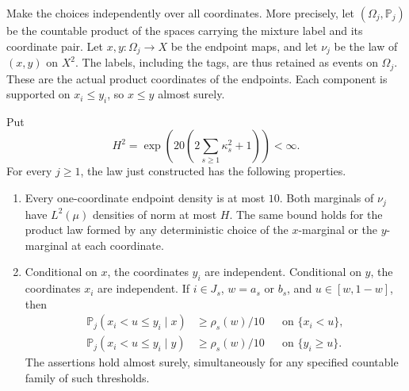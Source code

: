 Make the choices independently over all coordinates.  More precisely,
let $(\Omega_j,\mathbb P_j)$ be the countable product of the spaces
carrying the mixture label and its coordinate pair.  Let
$x,y:\Omega_j\to X$ be the endpoint maps, and let $\nu_j$ be the law of
$(x,y)$ on $X^2$.  The labels, including the tags, are thus retained as
events on $\Omega_j$.  These are the actual product coordinates of the
endpoints.  Each component is supported on $x_i\le y_i$, so $x\le y$
almost surely.

\begin{lemma}
\label{p:lem:coupling-marginals}
Put
\begin{equation}\label{p:eq:uniform-product-density}
 H^2=\exp\left(20\left(2\sum_{s\ge1}\kappa_s^2+1\right)\right)<\infty.
\end{equation}
For every $j\ge1$, the law just constructed has the following properties.
\begin{enumerate}
 \item Every one-coordinate endpoint density is at most $10$.  Both
 marginals of $\nu_j$ have $L^2(\mu)$ densities of norm at most $H$.
 The same bound holds for the product law formed by any deterministic
 choice of the $x$-marginal or the $y$-marginal at each coordinate.
 \item Conditional on $x$, the coordinates $y_i$ are independent.
 Conditional on $y$, the coordinates $x_i$ are independent.  If
 $i\in J_s$, $w=a_s$ or $b_s$, and $u\in[w,1-w]$, then
 \begin{align}
  \mathbb P_j(x_i<u\le y_i\mid x)&\ge\rho_s(w)/10
       &&\text{on }\{x_i<u\},\label{p:eq:crossing-given-x}\\
  \mathbb P_j(x_i<u\le y_i\mid y)&\ge\rho_s(w)/10
       &&\text{on }\{y_i\ge u\}.
       \label{p:eq:crossing-given-y}
 \end{align}
 The assertions hold almost surely, simultaneously for any specified
 countable family of such thresholds.
\end{enumerate}
\end{lemma}

